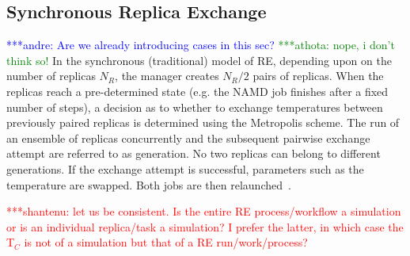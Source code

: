 \documentclass{rspublic}
\newcommand{\jhanote}[1]{ {\textcolor{red} { ***shantenu: #1 }}}
\newcommand{\alnote}[1]{ {\textcolor{blue} { ***andre: #1 }}}
\newcommand{\athotanote}[1]{ {\textcolor{green} { ***athota: #1 }}}
\newcommand{\alnote}[1]{}
\newcommand{\athotanote}[1]{}
\newcommand{\jhanote}[1]{}
\begin{document}
\subsection{Synchronous Replica Exchange}

\alnote{Are we already introducing cases in this sec?}
\athotanote{nope, i don't think so!}  In the synchronous (traditional)
model of RE, depending upon on the number of replicas ${N_R}$, the
manager creates ${N_R/2}$ pairs of replicas. When the replicas reach a
pre-determined state (e.g. the NAMD job finishes after a fixed number
of steps), a decision as to whether to exchange temperatures between
previously paired replicas is determined using the Metropolis scheme.
The run of an ensemble of replicas concurrently and the subsequent
pairwise exchange attempt are referred to as generation. No two
replicas can belong to different generations. If the exchange attempt
is successful, parameters such as the temperature are swapped. Both
jobs are then relaunched~\citep{Luckow:2008fp}.







\jhanote{let us be consistent. Is the entire RE process/workflow a  simulation or is an individual replica/task a simulation? I prefer  the latter, in which case the T$_C$ is not of a simulation but that  of a RE run/work/process?}  
\end{document}
